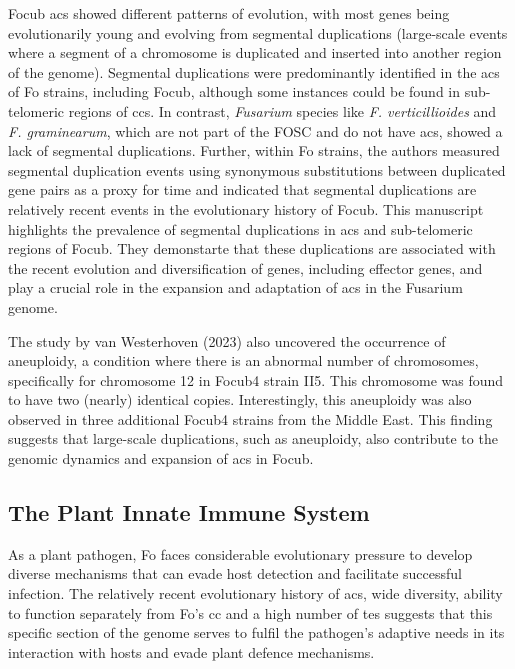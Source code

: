 \Ac{Focub} \acp{ac} showed different patterns of evolution, with most genes being evolutionarily young and evolving from segmental duplications (large-scale events where a segment of a chromosome is duplicated and inserted into another region of the genome). Segmental duplications were predominantly identified in the \acp{ac} of \ac{Fo} strains, including \ac{Focub}, although some instances could be found in sub-telomeric regions of \acp{cc}. In contrast, \textit{Fusarium} species like \textit{F. verticillioides} and \textit{F. graminearum}, which are not part of the \ac{FOSC} and do not have \acp{ac}, showed a lack of segmental duplications. Further, within \ac{Fo} strains, the authors measured segmental duplication events using synonymous substitutions between duplicated gene pairs as a proxy for time and indicated that segmental duplications are relatively recent events in the evolutionary history of \ac{Focub}. This manuscript highlights the prevalence of segmental duplications in \acp{ac} and sub-telomeric regions of \ac{Focub}. They demonstarte that these duplications are associated with the recent evolution and diversification of genes, including effector genes, and play a crucial role in the expansion and adaptation of \acp{ac} in the Fusarium genome. 

The study by van Westerhoven \et (2023) also uncovered the occurrence of aneuploidy, a condition where there is an abnormal number of chromosomes, specifically for chromosome 12 in  \ac{Focub4} strain II5. This chromosome was found to have two (nearly) identical copies. Interestingly, this aneuploidy was also observed in three additional \ac{Focub4} strains from the Middle East. This finding suggests that large-scale duplications, such as aneuploidy, also contribute to the genomic dynamics and expansion of \acp{ac} in \ac{Focub}.

\subsection{The Plant Innate Immune System}

As a plant pathogen, \ac{Fo} faces considerable evolutionary pressure to develop diverse mechanisms that can evade host detection and facilitate successful infection. The relatively recent evolutionary history of \acp{ac}, wide diversity, ability to function separately from \ac{Fo}'s \ac{cc} and a high number of \acp{te} suggests that this specific section of the genome serves to fulfil the pathogen's adaptive needs in its interaction with hosts and evade plant defence mechanisms.

